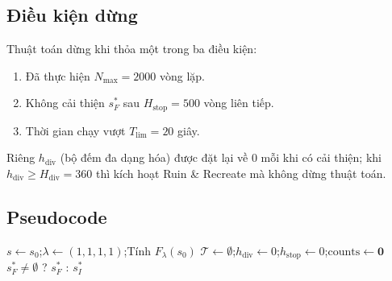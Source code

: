 \documentclass[../DoAn.tex]{subfiles}
\begin{document}
\subsection{Điều kiện dừng}

Thuật toán dừng khi thỏa một trong ba điều kiện:
\begin{enumerate}
    \item Đã thực hiện $N_{\max} = 2000$ vòng lặp.
    \item Không cải thiện $s^*_F$ sau $H_{\text{stop}} = 500$ vòng liên tiếp.
    \item Thời gian chạy vượt $T_{\text{lim}} = 20$ giây.
\end{enumerate}

Riêng $h_{\text{div}}$ (bộ đếm đa dạng hóa) được đặt lại về 0 mỗi khi có cải thiện; khi $h_{\text{div}} \geq H_{\text{div}} = 360$ thì kích hoạt Ruin \& Recreate mà không dừng thuật toán.

\subsection{Pseudocode}

\begin{algorithm}[ht]
\caption{Adaptive Tabu Search (Phần 1/2): Khởi tạo và đa dạng hóa}
\label{alg:ts1}
$s \leftarrow s_0$;\quad $\lambda \leftarrow (1,1,1,1)$;\quad Tính $F_\lambda(s_0)$\;
$\mathcal{T} \leftarrow \emptyset$;\quad $h_{\text{div}} \leftarrow 0$;\quad $h_{\text{stop}} \leftarrow 0$;\quad $\text{counts} \leftarrow \mathbf{0}$\;
\Return $s^*_F \neq \emptyset$ \upshape? $s^*_F$ : $s^*_I$\;
\end{algorithm}
\end{document}
